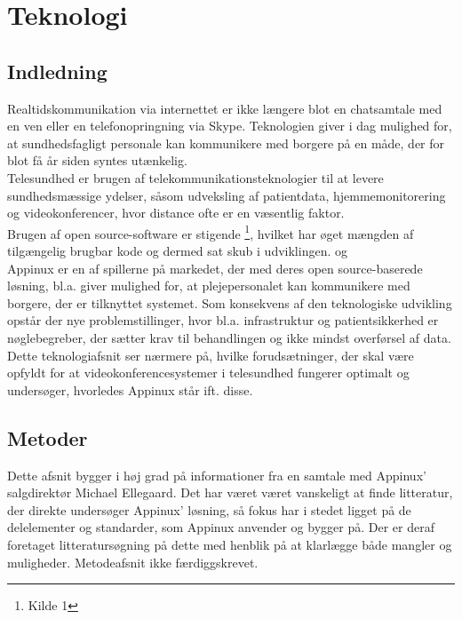 \chapter{Teknologi}

\section{Indledning}
Realtidskommunikation via internettet er ikke længere blot en chatsamtale med en ven eller en telefonopringning via Skype. Teknologien giver i dag mulighed for, at sundhedsfagligt personale kan kommunikere med borgere på en måde, der for blot få år siden syntes utænkelig.\\Telesundhed er brugen af telekommunikationsteknologier til at levere sundhedsmæssige ydelser, såsom udveksling af patientdata, hjemmemonitorering og videokonferencer, hvor distance ofte er en væsentlig faktor.\\
Brugen af open source-software er stigende \footnote{Kilde 1}, hvilket har øget mængden af tilgængelig brugbar kode og dermed sat skub i udviklingen. \cite{hp2} og \cite{hp4}
\\
Appinux er en af spillerne på markedet, der med deres open source-baserede løsning, bl.a. giver mulighed for, at plejepersonalet kan kommunikere med borgere, der er tilknyttet systemet. Som konsekvens af den teknologiske udvikling opstår der nye problemstillinger, hvor bl.a. infrastruktur og patientsikkerhed er nøglebegreber, der sætter krav til behandlingen og ikke mindst overførsel af data. Dette teknologiafsnit ser nærmere på, hvilke forudsætninger, der skal være opfyldt for at videokonferencesystemer i telesundhed fungerer optimalt og undersøger, hvorledes Appinux står ift. disse.
\section{Metoder}
Dette afsnit bygger i høj grad på informationer fra en samtale med Appinux' salgdirektør Michael Ellegaard. Det har været været vanskeligt at finde litteratur, der direkte undersøger Appinux' løsning, så fokus har i stedet ligget på de delelementer og standarder, som Appinux anvender og bygger på. Der er deraf foretaget litteratursøgning på dette med henblik på at klarlægge både mangler og muligheder.
Metodeafsnit ikke færdiggskrevet.

